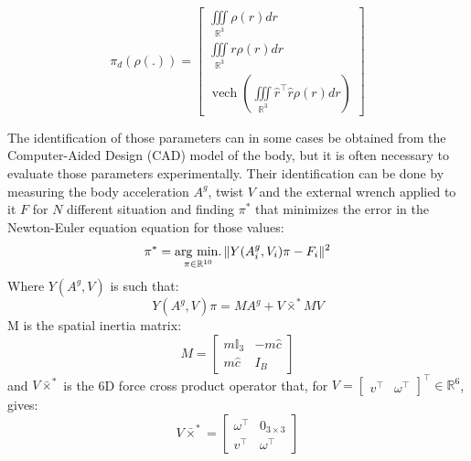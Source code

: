 \begin{equation}
\pi_d(\rho(.))
  =
  \begin{bmatrix}
    \iiint\limits_{\mathbb{R}^3} \rho(r) dr \\
    \iiint\limits_{\mathbb{R}^3} r \rho(r) dr \\
    \operatorname{vech}\left(
    \iiint\limits_{\mathbb{R}^3} {\hat{r}}^\top \hat{r} \rho({r}) d{r} \right)
  \end{bmatrix}
\end{equation}

The identification of those parameters can in some cases be obtained from the Computer-Aided Design (CAD) model of the body, but it is often necessary to evaluate those parameters experimentally.
Their identification can be done by measuring the body acceleration $A^g$, twist $V$ and the external wrench applied to it $F$ for $N$ different situation and finding $\pi^*$ that minimizes the error in the Newton-Euler equation equation for those values:
\begin{equation}
\label{eq:classicIdentif}
  \pi^* = \operatorname*{arg\ min.}_{\pi\in\mathbb{R}^{10}} \|Y(A^g_i,V_i)\pi -F_i\|^2
\end{equation}
Where $Y(A^g,V)$ is such that:
$$
Y(A^g,V)\pi = M A^g + V\bar{\times}^*MV
$$
M is the spatial inertia matrix:
\begin{equation}
M=
  \begin{bmatrix}
    m\mathbb{I}_3 & -m\hat{c} \\
    m\hat{c} & I_B
  \end{bmatrix}
\end{equation}
and $V \bar \times^*$ is the 6D force cross product operator \cite{featherstone:book:2007} that, for $V = \begin{bmatrix} v^\top & \omega^\top \end{bmatrix}^\top \in \mathbb{R}^6$, gives:
$$
V \bar \times^*
=
\begin{bmatrix}
\omega^\top & 0_{3\times3} \\
v^\top      & \omega^\top
\end{bmatrix}
$$

